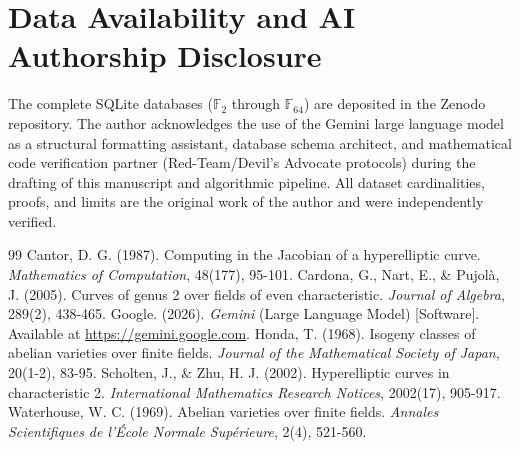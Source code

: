 \documentclass[letterpaper, 11pt]{article}
\begin{document}
	\section{Data Availability and AI Authorship Disclosure}
	The complete SQLite databases ($\mathbb{F}_{2}$ through $\mathbb{F}_{64}$) are deposited in the Zenodo repository. The author acknowledges the use of the Gemini large language model \cite{Gemini2026} as a structural formatting assistant, database schema architect, and mathematical code verification partner (Red-Team/Devil's Advocate protocols) during the drafting of this manuscript and algorithmic pipeline. All dataset cardinalities, proofs, and limits are the original work of the author and were independently verified.
	
	\begin{thebibliography}{99}
		 Cantor, D. G. (1987). Computing in the Jacobian of a hyperelliptic curve. \textit{Mathematics of Computation}, 48(177), 95-101.
		 Cardona, G., Nart, E., \& Pujolà, J. (2005). Curves of genus 2 over fields of even characteristic. \textit{Journal of Algebra}, 289(2), 438-465.
		 Google. (2026). \textit{Gemini} (Large Language Model) [Software]. Available at \url{https://gemini.google.com}.
		 Honda, T. (1968). Isogeny classes of abelian varieties over finite fields. \textit{Journal of the Mathematical Society of Japan}, 20(1-2), 83-95.
		 Scholten, J., \& Zhu, H. J. (2002). Hyperelliptic curves in characteristic 2. \textit{International Mathematics Research Notices}, 2002(17), 905-917.
		 Waterhouse, W. C. (1969). Abelian varieties over finite fields. \textit{Annales Scientifiques de l'École Normale Supérieure}, 2(4), 521-560.
	\end{thebibliography}
	
\end{document}
